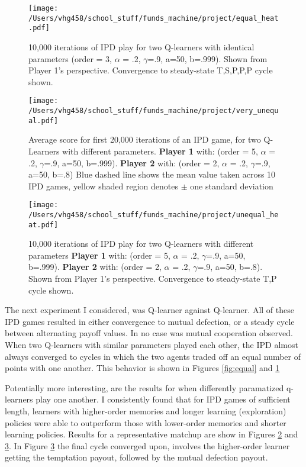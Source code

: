 \documentclass[12pt]{amsart}
\newcommand{\0}{\mat{0}}
\newcommand{\1}{\mathds{1}}
\begin{document}
 \begin{figure}
    \texttt{[image: /Users/vhg458/school\_stuff/funds\_machine/project/equal\_heat.pdf]}
      \centering
        \caption{10,000 iterations of IPD play for two Q-learners with identical parameters (order = 3, $\alpha$ = .2, $\gamma$=.9, a=50, b=.999).  Shown from Player 1's perspective.  Convergence to steady-state {T,S,P,P,P} cycle shown. 
}
  	\label{fig:heat_equal}
    \end{figure}

 \begin{figure}
    \texttt{[image: /Users/vhg458/school\_stuff/funds\_machine/project/very\_unequal.pdf]}
      \centering
        \caption{Average score for first 20,000 iterations of an IPD game, for two Q-Learners with different parameters.  {\bf Player 1} with:  (order = 5, $\alpha$ = .2, $\gamma$=.9, a=50, b=.999).  {\bf Player 2} with: (order = 2, $\alpha$ = .2, $\gamma$=.9, a=50, b=.8) Blue dashed line shows the mean value taken across 10 IPD games, yellow shaded region denotes $\pm$ one standard deviation}
  	\label{fig:unequal}
    \end{figure}
    
 \begin{figure}
    \texttt{[image: /Users/vhg458/school\_stuff/funds\_machine/project/unequal\_heat.pdf]}
      \centering
        \caption{10,000 iterations of IPD play for two Q-learners with different parameters  {\bf Player 1} with:  (order = 5, $\alpha$ = .2, $\gamma$=.9, a=50, b=.999).  {\bf Player 2} with: (order = 2, $\alpha$ = .2, $\gamma$=.9, a=50, b=.8).  Shown from Player 1's perspective.  Convergence to steady-state {T,P} cycle shown. 
}
  	\label{fig:heat_unequal}
    \end{figure}

The next experiment I considered, was Q-learner against Q-learner.  All of these IPD games resulted in either convergence to mutual defection, or a steady cycle between alternating payoff values.  In no case was mutual cooperation observed.  When two Q-learners with similar parameters played each other, the IPD almost always converged to cycles in which the two agents traded off an equal number of points with one another.  This behavior is shown in Figures  \ref{fig:equal} and  \ref{fig:heat_equal}

Potentially more interesting, are the results for when differently paramatized q-learners play one another.  I consistently found that for IPD games of sufficient length, learners with higher-order memories and longer learning (exploration) policies were able to outperform those with lower-order memories and shorter learning policies.  Results for a representative matchup are show in Figures  \ref{fig:unequal} and  \ref{fig:heat_unequal}.  In Figure \ref{fig:heat_unequal} the final cycle converged upon, involves the higher-order learner getting the temptation payout, followed by the mutual defection payout.   
   
\end{document}
